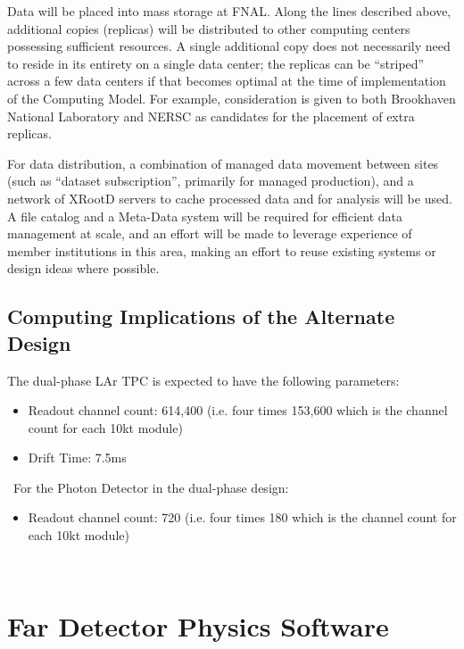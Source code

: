 Data will be placed into mass storage at FNAL. Along the lines described above, additional copies (replicas) will be distributed to other
computing centers possessing sufficient resources.
A single additional copy does not necessarily need to reside in its entirety on a single data center; the replicas can be ``striped'' across a few data centers if that
becomes optimal at the time of implementation of the Computing Model. For example, consideration is given to both Brookhaven National Laboratory
and NERSC as candidates for the placement of extra replicas.

For data distribution, a combination of managed data movement between sites (such as ``dataset subscription'',
primarily for managed production), and a network of XRootD servers to cache processed data and for analysis will be used.
A file catalog and a Meta-Data system will be required for efficient data management at scale, and an effort will be made to leverage experience of
member institutions in this area, making an effort to reuse existing systems or design ideas where possible.

\subsection{Computing Implications of the Alternate Design}
\label{sec:detectors-sc-alternate}
The dual-phase LAr TPC is expected to have the following parameters:
\begin{itemize}
	\item Readout channel count: 614,400 (i.e. four times 153,600 which is the channel count
	for each 10kt module)
	\item Drift Time: 7.5ms
\end{itemize}
\
For the Photon Detector in the dual-phase design:
\begin{itemize}
	\item Readout channel count: 720 (i.e. four times 180 which is the channel count
	for each 10kt module)
\end{itemize}
\
\section{Far Detector Physics Software}
\label{sec:detectors-sc-physics-software}


